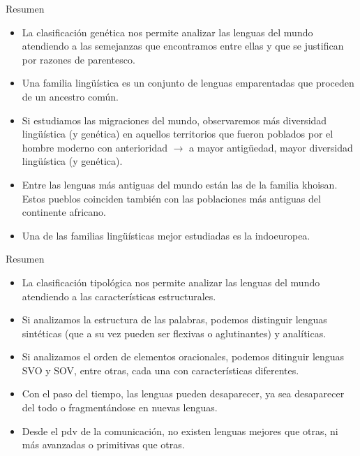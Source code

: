 \documentclass[handout]{beamer}
\begin{document}
\begin{frame}{Resumen}
\begin{itemize}
	\item La clasificación genética nos permite analizar las lenguas del mundo atendiendo a las semejanzas que encontramos entre ellas y que se justifican por razones de parentesco.
	\item Una familia lingüística es un conjunto de lenguas emparentadas que proceden de un ancestro común.
	\item Si estudiamos las migraciones del mundo, observaremos más diversidad lingüística (y genética) en aquellos territorios que fueron poblados por el hombre moderno con anterioridad $\rightarrow$ a mayor antigüedad, mayor diversidad lingüística (y genética).
	\item Entre las lenguas más antiguas del mundo están las de la familia khoisan. Estos pueblos coinciden también con las poblaciones más antiguas del continente africano.
	\item Una de las familias lingüísticas mejor estudiadas es la indoeuropea.
\end{itemize}
\end{frame}

\begin{frame}{Resumen}
\begin{itemize}
	\item La clasificación tipológica nos permite analizar las lenguas del mundo atendiendo a las características estructurales.
	\item Si analizamos la estructura de las palabras, podemos distinguir lenguas sintéticas (que a su vez pueden ser flexivas o aglutinantes) y analíticas.
	\item Si analizamos el orden de elementos oracionales, podemos ditinguir lenguas SVO y SOV, entre otras, cada una con características diferentes.
	\item Con el paso del tiempo, las lenguas pueden desaparecer, ya sea desaparecer del todo o fragmentándose en nuevas lenguas.
	\item Desde el pdv de la comunicación, no existen lenguas mejores que otras, ni más avanzadas o primitivas que otras.
\end{itemize}
\end{frame}
\end{document}
